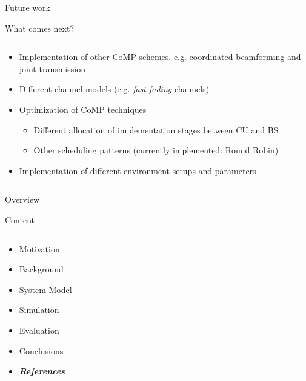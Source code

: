\documentclass[xcolor={cmyk}]{beamer}
\begin{document}
 \begin{frame}{Future work}
	 \begin{block}{What comes next?}
	 	\begin{columns}
			\begin{column}{.9\textwidth}
				\begin{itemize}
					\item Implementation of other CoMP schemes, e.g. coordinated beamforming and joint transmission
					\item Different channel models (e.g. \textit{fast fading} channels)
					\item Optimization of CoMP techniques
					\begin{itemize}
						\item Different allocation of implementation stages between CU and BS
						\item Other scheduling patterns (currently implemented: Round Robin)
					\end{itemize}
					\item Implementation of different environment setups and parameters
				\end{itemize}
			\end{column}
		\end{columns}
	 \end{block}
 \end{frame}


\begin{frame}{Overview}
	\begin{block}{Content}
		\begin{columns}
			\begin{column}{.9\textwidth}
				\begin{itemize}
					\item Motivation
					\item Background
					\item System Model
					\item Simulation
					\item Evaluation
					\item Conclusions
					\item \textbf{\emph{References}}
				\end{itemize}
			\end{column}
		\end{columns}
	\end{block}
\end{frame}
\end{document}
